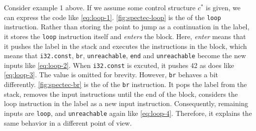 Consider example 1 above.
If we assume some control structure $c^*$ is given, we can express the code
like \cref{eq:loop-1}.
\cref{fig:spectec-loop} is the \spectecp{} of the \texttt{loop} instruction.
Rather than storing the point to jump as a continuation in the label, it stores
the \texttt{loop} instruction itself and \textit{enters} the block.
Here, \textit{enter} means that it pushes the label in the stack and executes
the instructions in the block, which means that \texttt{i32.const},
\texttt{br}, \texttt{unreachable}, \texttt{end} and \texttt{unreachable} become
the new inputs like \cref{eq:loop-2}.
When \texttt{i32.const} is excuted, it pushes 42 as \officialp{} does
like \cref{eq:loop-3}.
The value is omitted for brevity.
However, \texttt{br} behaves a bit differently.
\cref{fig:spectec-br} is the \spectecp{} of the \texttt{br} instruction.
It pops the label from the stack, removes the input instructions until the end
of the block, considers the loop instruction in the label as a new input
instruction.
Consequently, remaining inputs are \texttt{loop}, and \texttt{unreachable}
again like \cref{eq:loop-4}.
Therefore, it explains the same behavior in a different point of view.






